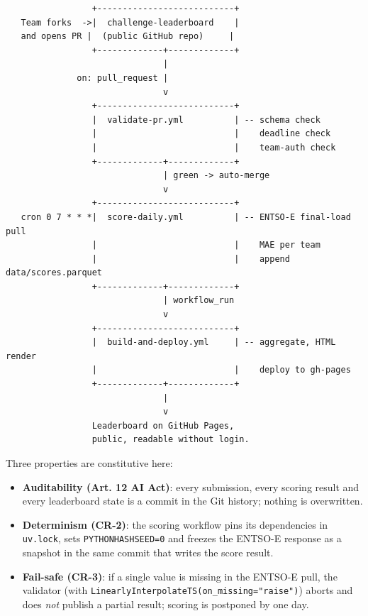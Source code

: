 \documentclass[
  english,
  letterpaper,
]{scrbook}
\providecommand{\tightlist}{%
  \setlength{\itemsep}{0pt}\setlength{\parskip}{0pt}}
\begin{document}
\begin{verbatim}
                 +---------------------------+
   Team forks  ->|  challenge-leaderboard    |
   and opens PR |  (public GitHub repo)     |
                 +-------------+-------------+
                               |
              on: pull_request |
                               v
                 +---------------------------+
                 |  validate-pr.yml          | -- schema check
                 |                           |    deadline check
                 |                           |    team-auth check
                 +-------------+-------------+
                               | green -> auto-merge
                               v
                 +---------------------------+
   cron 0 7 * * *|  score-daily.yml          | -- ENTSO-E final-load pull
                 |                           |    MAE per team
                 |                           |    append data/scores.parquet
                 +-------------+-------------+
                               | workflow_run
                               v
                 +---------------------------+
                 |  build-and-deploy.yml     | -- aggregate, HTML render
                 |                           |    deploy to gh-pages
                 +-------------+-------------+
                               |
                               v
                 Leaderboard on GitHub Pages,
                 public, readable without login.
\end{verbatim}

Three properties are constitutive here:

\begin{itemize}
\tightlist
\item
  \textbf{Auditability (Art. 12 AI Act)}: every submission, every
  scoring result and every leaderboard state is a commit in the Git
  history; nothing is overwritten.
\item
  \textbf{Determinism (CR-2)}: the scoring workflow pins its
  dependencies in \texttt{uv.lock}, sets \texttt{PYTHONHASHSEED=0} and
  freezes the ENTSO-E response as a snapshot in the same commit that
  writes the score result.
\item
  \textbf{Fail-safe (CR-3)}: if a single value is missing in the ENTSO-E
  pull, the validator (with
  \texttt{LinearlyInterpolateTS(on\_missing="raise")}) aborts and does
  \emph{not} publish a partial result; scoring is postponed by one day.
\end{itemize}
\end{document}
